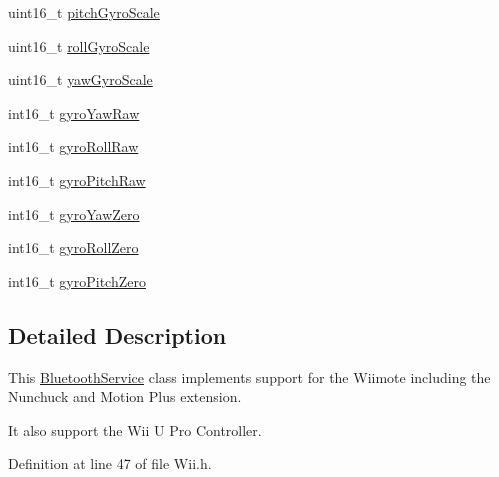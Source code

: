 {\bf }\par
\begin{DoxyCompactItemize}
\item 
uint16\-\_\-t \hyperlink{class_w_i_i_aea6ce6f3222df3e547e9957673c7a07a}{pitch\-Gyro\-Scale}
\item 
uint16\-\_\-t \hyperlink{class_w_i_i_a6c0971ae4c9ab752888a5871020c8331}{roll\-Gyro\-Scale}
\item 
uint16\-\_\-t \hyperlink{class_w_i_i_a0694969a30092b9b1dcb26120c7cff73}{yaw\-Gyro\-Scale}
\end{DoxyCompactItemize}

{\bf }\par
\begin{DoxyCompactItemize}
\item 
int16\-\_\-t \hyperlink{class_w_i_i_ab813b65548e827f41a5192fcc34056ea}{gyro\-Yaw\-Raw}
\item 
int16\-\_\-t \hyperlink{class_w_i_i_a0784c779ebeae2d459996c35a54ee3b8}{gyro\-Roll\-Raw}
\item 
int16\-\_\-t \hyperlink{class_w_i_i_a749ea9dd39ba9a5320c5b24ce93bc544}{gyro\-Pitch\-Raw}
\end{DoxyCompactItemize}

{\bf }\par
\begin{DoxyCompactItemize}
\item 
int16\-\_\-t \hyperlink{class_w_i_i_ad4f0d2456c56414f9b8013b85a1ee7d2}{gyro\-Yaw\-Zero}
\item 
int16\-\_\-t \hyperlink{class_w_i_i_a10d91cd5d73bc655be776b44d27004c9}{gyro\-Roll\-Zero}
\item 
int16\-\_\-t \hyperlink{class_w_i_i_abbc31ecd4495d70258cfa095e34cb3c3}{gyro\-Pitch\-Zero}
\end{DoxyCompactItemize}



\subsection{\-Detailed \-Description}
\-This \hyperlink{class_bluetooth_service}{\-Bluetooth\-Service} class implements support for the \-Wiimote including the \-Nunchuck and \-Motion \-Plus extension.

\-It also support the \-Wii \-U \-Pro \-Controller. 

\-Definition at line 47 of file \-Wii.\-h.



